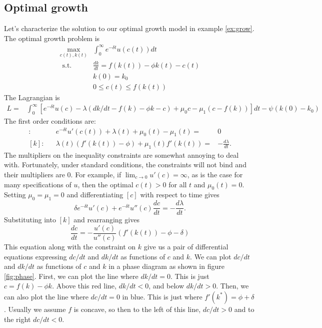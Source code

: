 \subsection{Optimal growth}
Let's characterize the solution to our optimal growth model in example
\ref{ex:grow}. The optimal growth problem is
\begin{align*}
  \max_{c(t),k(t)} & \int_0^\infty e^{-\delta t} u(c(t)) dt \\
  \text{ s.t. } & \frac{dk}{dt} = f(k(t)) - \phi k(t) - c(t) \\
  & k(0) = k_0 \\
  & 0 \leq c(t) \leq f(k(t))
\end{align*}
The Lagrangian is
\begin{align*}
  L = & \int_0^\infty \left[e^{-\delta t} u(c) - \lambda(dk/dt - f(k) -
  \phi k - c ) + \mu_0 c - \mu_1 (c - f(k)) \right]dt - \psi(k(0) -
  k_0)
\end{align*}
The first order conditions are:
\begin{align*}
  [c]: && e^{-\delta t} u'(c(t)) + \lambda(t) + \mu_0(t) - \mu_1(t) = & 0
  \\
  [k]: && \lambda (t) \left( f'(k(t))  - \phi \right) + \mu_1(t)
  f'(k(t)) = & -\frac{d\lambda}{dt}. 
\end{align*}
The multipliers on the inequality constraints are somewhat annoying to
deal with. Fortunately, under standard conditions, the constraints
will not bind and their multipliers are $0$. For example, if $\lim_{c
  \to 0} u'(c) = \infty$, as is the case for many specifications of
$u$, then the optimal $c(t) > 0$ for all $t$ and $\mu_0(t) =
0$. Setting $\mu_0=\mu_1=0$ and differentiating $[c]$ with respect to time
gives
\[ \delta e^{-\delta t} u'(c) + e^{-\delta t} u''(c) \frac{dc}{dt}  = - \frac{d\lambda}{dt}. \]
Substituting into $[k]$ and rearranging gives
\[ \frac{dc}{dt} = -\frac{u'(c)}{u''(c)} \left(f'(k(t)) - \phi -
  \delta \right) \]
This equation along with the constraint on $k$ give us a pair of
differential equations expressing $dc/dt$ and $dk/dt$ as functions of
$c$ and $k$. We can plot $dc/dt$ and $dk/dt$ as functions of $c$ and
$k$ in a phase diagram as shown in figure \ref{fig:phase}. First, we
can plot the line where $dk/dt = 0$. This is just $c = f(k) - \phi
k$.
Above this red line, $dk/dt< 0$, and below $dk/dt>0$.  Then, we can
also plot the line where $dc/dt = 0$ in blue. This is just where
$f'(k^*) = \phi + \delta$. Usually we assume $f$ is concave, so then
to the left of this line, $dc/dt>0$ and to the right $dc/dt<0$.

